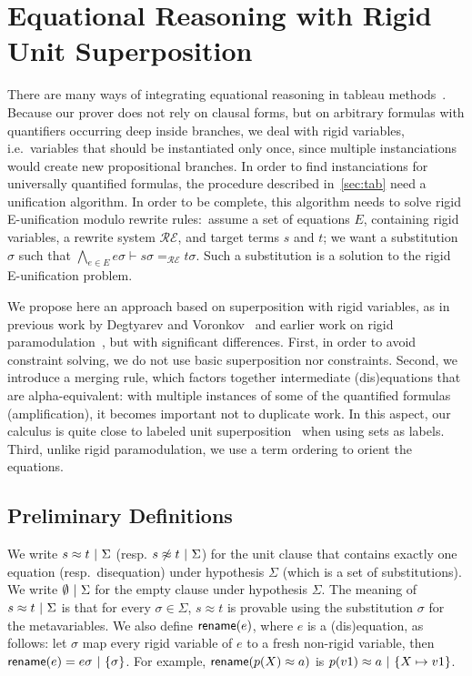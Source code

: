 
\section{Equational Reasoning with Rigid Unit Superposition}
\label{sec:super}

There are many ways of integrating equational reasoning in tableau
methods~\cite{DB75,LS02,BR15,DV96}. Because our prover does not rely on clausal
forms, but on arbitrary formulas with quantifiers occurring deep inside
branches, we deal with rigid variables, i.e.~variables that should be instantiated
only once, since multiple instanciations would create new propositional branches.
In order to find instanciations for universally quantified formulas, the procedure
described in~\ref{sec:tab} need a unification algorithm. In order to be complete,
this algorithm needs to solve rigid E-unification modulo rewrite rules:~assume a set of
equations $E$, containing rigid variables, a rewrite system $\mathcal{RE}$,
and target terms $s$ and $t$; we want a substitution $\sigma$ such that
$\bigwedge_{e \in E} e\sigma \vdash s\sigma =_\mathcal{RE} t\sigma$. Such a
substitution is a solution to the rigid E-unification problem.

We propose here an approach based on superposition with rigid variables, as in
previous work by Degtyarev and Voronkov~\cite{DV96} and earlier work on rigid
paramodulation~\cite{DAP00}, but with significant differences. First, in order
to avoid constraint solving, we do not use basic superposition nor
constraints. Second, we introduce a merging rule, which factors together
intermediate (dis)equations that are alpha-equivalent: with multiple instances
of some of the quantified formulas (amplification), it becomes important not to
duplicate work. In this aspect, our calculus is quite close to labeled unit
superposition~\cite{KS10} when using sets as labels. Third, unlike rigid
paramodulation, we use a term ordering to orient the equations.

\subsection{Preliminary Definitions}

We write $  s \approx t  ~|~  \Sigma$ (resp.
$ s \not\approx t  ~|~  \Sigma$) for the unit clause that contains
exactly one equation (resp.~disequation) under hypothesis $\Sigma$ (which is a
set of substitutions). We write $\emptyset ~|~ \Sigma$ for the
empty clause under hypothesis $\Sigma$.
The meaning of $s \approx t ~|~  \Sigma$ is
that for every $\sigma \in \Sigma$, $s \approx t$ is provable using the
substitution $\sigma$ for the metavariables.
We also define $\textsf{rename}(e)$, where $e$
is a (dis)equation, as follows: let $\sigma$ map every rigid variable of $e$ to
a fresh non-rigid variable, then
$\textsf{rename}(e) =  e\sigma  ~|~  \{ \sigma \} $. For example,
$\textsf{rename}(p(X)\approx a)$ is $ p(v1)\approx a ~|~  \{ X\mapsto
v1\} $.

